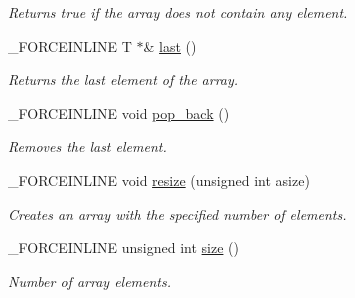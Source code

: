 \begin{DoxyCompactItemize}
\begin{DoxyCompactList}\small\item\em Returns true if the array does not contain any element. \end{DoxyCompactList}\item 
\hypertarget{classbt_1_1_void_vector_a4e1ae1c12ac21ddfdd186a0515329b2c}{\-\_\-\-F\-O\-R\-C\-E\-I\-N\-L\-I\-N\-E T $\ast$\& \hyperlink{classbt_1_1_void_vector_a4e1ae1c12ac21ddfdd186a0515329b2c}{last} ()}\label{classbt_1_1_void_vector_a4e1ae1c12ac21ddfdd186a0515329b2c}

\begin{DoxyCompactList}\small\item\em Returns the last element of the array. \end{DoxyCompactList}\item 
\hypertarget{classbt_1_1_void_vector_a511b676e99ec0b46031b7b165af18d29}{\-\_\-\-F\-O\-R\-C\-E\-I\-N\-L\-I\-N\-E void \hyperlink{classbt_1_1_void_vector_a511b676e99ec0b46031b7b165af18d29}{pop\-\_\-back} ()}\label{classbt_1_1_void_vector_a511b676e99ec0b46031b7b165af18d29}

\begin{DoxyCompactList}\small\item\em Removes the last element. \end{DoxyCompactList}\item 
\hypertarget{classbt_1_1_void_vector_a4e1600fb9704b6bf349e0e62aa0eaffa}{\-\_\-\-F\-O\-R\-C\-E\-I\-N\-L\-I\-N\-E void \hyperlink{classbt_1_1_void_vector_a4e1600fb9704b6bf349e0e62aa0eaffa}{resize} (unsigned int asize)}\label{classbt_1_1_void_vector_a4e1600fb9704b6bf349e0e62aa0eaffa}

\begin{DoxyCompactList}\small\item\em Creates an array with the specified number of elements. \end{DoxyCompactList}\item 
\hypertarget{classbt_1_1_void_vector_ab3bc6d6bb373f0b0e7a9a0e48d57fc48}{\-\_\-\-F\-O\-R\-C\-E\-I\-N\-L\-I\-N\-E unsigned int \hyperlink{classbt_1_1_void_vector_ab3bc6d6bb373f0b0e7a9a0e48d57fc48}{size} ()}\label{classbt_1_1_void_vector_ab3bc6d6bb373f0b0e7a9a0e48d57fc48}

\begin{DoxyCompactList}\small\item\em Number of array elements. \end{DoxyCompactList}\end{DoxyCompactItemize}


